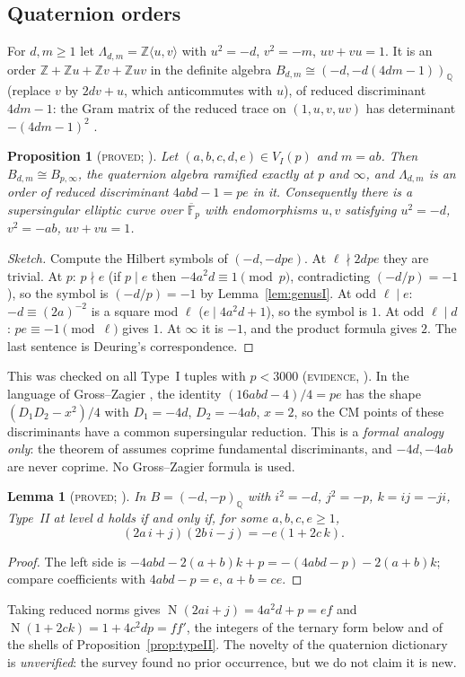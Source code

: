 \documentclass[10pt,reqno]{amsart}
\newtheorem{lemma}[theorem]{Lemma}
\newtheorem{proposition}[theorem]{Proposition}
\theoremstyle{definition}
\numberwithin{equation}{section}
\newcommand{\Z}{\mathbb Z}
\newcommand{\Q}{\mathbb Q}
\DeclareMathOperator{\Nm}{N}
\newcommand{\status}[1]{\textup{\textsc{#1}}}
\begin{document}
\subsection{Quaternion orders}
For $d,m\ge1$ let $\Lambda_{d,m}=\Z\langle u,v\rangle$ with $u^2=-d$,
$v^2=-m$, $uv+vu=1$. It is an order $\Z+\Z u+\Z v+\Z uv$ in the definite
algebra $B_{d,m}\cong(-d,-d(4dm-1))_\Q$ (replace $v$ by $2dv+u$, which
anticommutes with $u$), of reduced discriminant $4dm-1$: the Gram matrix of
the reduced trace on $(1,u,v,uv)$ has determinant $-(4dm-1)^2$
\cite[Lemma~1.2]{O130}.

\begin{proposition}[\status{proved}; {\cite[Prop.~1.3]{O130}}]\label{prop:quat}
Let $(a,b,c,d,e)\in V_I(p)$ and $m=ab$. Then $B_{d,m}\cong B_{p,\infty}$, the
quaternion algebra ramified exactly at $p$ and $\infty$, and $\Lambda_{d,m}$
is an order of reduced discriminant $4abd-1=pe$ in it. Consequently there is
a supersingular elliptic curve over $\overline{\mathbb F}_p$ with
endomorphisms $u,v$ satisfying $u^2=-d$, $v^2=-ab$, $uv+vu=1$.
\end{proposition}
\begin{proof}[Sketch]
Compute the Hilbert symbols of $(-d,-dpe)$. At $\ell\nmid2dpe$ they are
trivial. At $p$: $p\nmid e$ (if $p\mid e$ then $-4a^2d\equiv1\pmod p$,
contradicting $(-d/p)=-1$), so the symbol is $(-d/p)=-1$ by
Lemma~\ref{lem:genusI}. At odd $\ell\mid e$: $-d\equiv(2a)^{-2}$ is a square
mod $\ell$ ($e\mid4a^2d+1$), so the symbol is $1$. At odd $\ell\mid d$:
$pe\equiv-1\pmod\ell$ gives $1$. At $\infty$ it is $-1$, and the product
formula gives $2$. The last sentence is Deuring's correspondence.
\end{proof}
This was checked on all Type~I tuples with $p<3000$ (\status{evidence},
\cite{O130}). In the language of Gross--Zagier \cite{GZ}, the identity
$(16abd-4)/4=pe$ has the shape $(D_1D_2-x^2)/4$ with $D_1=-4d$, $D_2=-4ab$,
$x=2$, so the CM points of these discriminants have a common supersingular
reduction. This is a \emph{formal analogy only}: the theorem of \cite{GZ}
assumes coprime fundamental discriminants, and $-4d,-4ab$ are never
coprime. No Gross--Zagier formula is used.

\begin{lemma}[\status{proved}; {\cite[Lemma~3.1]{O130}}]\label{lem:dp}
In $B=(-d,-p)_\Q$ with $i^2=-d$, $j^2=-p$, $k=ij=-ji$, Type~II at level $d$
holds if and only if, for some $a,b,c,e\ge1$,
\[(2a\,i+j)(2b\,i-j)=-e(1+2c\,k).\]
\end{lemma}
\begin{proof}
The left side is $-4abd-2(a+b)k+p=-(4abd-p)-2(a+b)k$; compare coefficients
with $4abd-p=e$, $a+b=ce$.
\end{proof}
Taking reduced norms gives $\Nm(2ai+j)=4a^2d+p=ef$ and
$\Nm(1+2ck)=1+4c^2dp=ff'$, the integers of the ternary form below and of
the shells of Proposition~\ref{prop:typeII}. The novelty of the quaternion
dictionary is \emph{unverified}: the survey \cite{LA} found no prior
occurrence, but we do not claim it is new.
\end{document}
